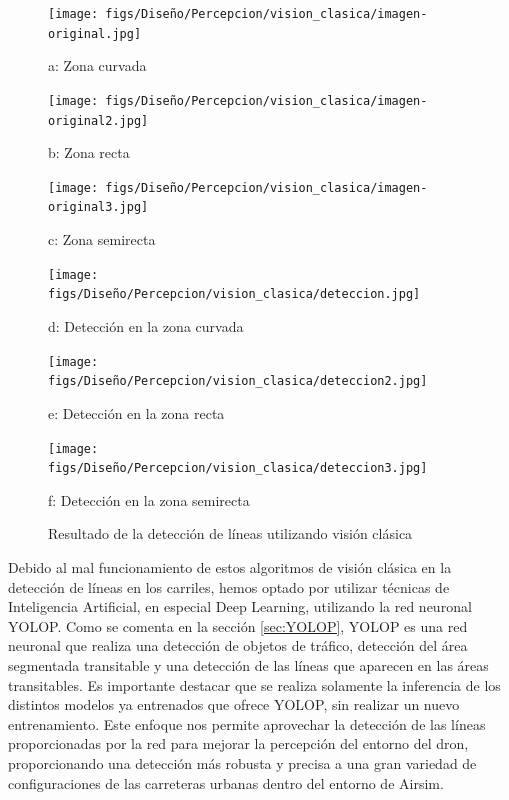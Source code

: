 \begin{figure}[H]
  \centering
  \begin{minipage}[t]{0.3\textwidth}
      \centering
      \texttt{[image: figs/Diseño/Percepcion/vision\_clasica/imagen-original.jpg]}
      \caption*{a: Zona curvada}
  \end{minipage}
  \hfill
  \begin{minipage}[t]{0.3\textwidth}
      \centering
      \texttt{[image: figs/Diseño/Percepcion/vision\_clasica/imagen-original2.jpg]}
      \caption*{b: Zona recta}
  \end{minipage}
  \hfill
  \begin{minipage}[t]{0.3\textwidth}
      \centering
      \texttt{[image: figs/Diseño/Percepcion/vision\_clasica/imagen-original3.jpg]}
      \caption*{c: Zona semirecta}
  \end{minipage}
  
  \vspace{1cm}
  
  \begin{minipage}[t]{0.3\textwidth}
      \centering
      \texttt{[image: figs/Diseño/Percepcion/vision\_clasica/deteccion.jpg]}
      \caption*{d: Detección en la zona curvada}
  \end{minipage}
  \hfill
  \begin{minipage}[t]{0.3\textwidth}
      \centering
      \texttt{[image: figs/Diseño/Percepcion/vision\_clasica/deteccion2.jpg]}
      \caption*{e: Detección en la zona recta}
  \end{minipage}
  \hfill
  \begin{minipage}[t]{0.3\textwidth}
      \centering
      \texttt{[image: figs/Diseño/Percepcion/vision\_clasica/deteccion3.jpg]}
      \caption*{f: Detección en la zona semirecta}
  \end{minipage}
  \caption{Resultado de la detección de líneas utilizando visión clásica}
  \label{Vision_clasica}
\end{figure}

Debido al mal funcionamiento de estos algoritmos de visión clásica en la detección de líneas en los carriles, 
hemos optado por utilizar técnicas de Inteligencia Artificial, en especial Deep Learning, utilizando la red neuronal YOLOP. Como se comenta en la sección \ref{sec:YOLOP}, 
YOLOP es una red neuronal que realiza una detección de objetos de tráfico, detección del área segmentada transitable y una detección de las líneas que aparecen en las áreas transitables. Es importante 
destacar que se realiza solamente la inferencia de los distintos modelos ya entrenados que ofrece YOLOP, sin realizar un nuevo entrenamiento. Este enfoque nos permite aprovechar 
la detección de las líneas proporcionadas por la red para mejorar la percepción del entorno del dron, proporcionando una detección más robusta y precisa a una gran variedad de configuraciones
de las carreteras urbanas dentro del entorno de Airsim. 

